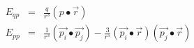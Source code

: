 \documentclass[12pt]{article}
\begin{document}
\begin{eqnarray*}
E_{qp} & = & \frac{q}{r^3} (p \bullet \vec{r}) \\
E_{pp} & = & \frac{1}{r^3} (\vec{p_i} \bullet \vec{p_j}) - 
             \frac{3}{r^5} (\vec{p_i} \bullet \vec{r}) (\vec{p_j} \bullet \vec{r}) 
\end{eqnarray*}                                                   
\end{document}
